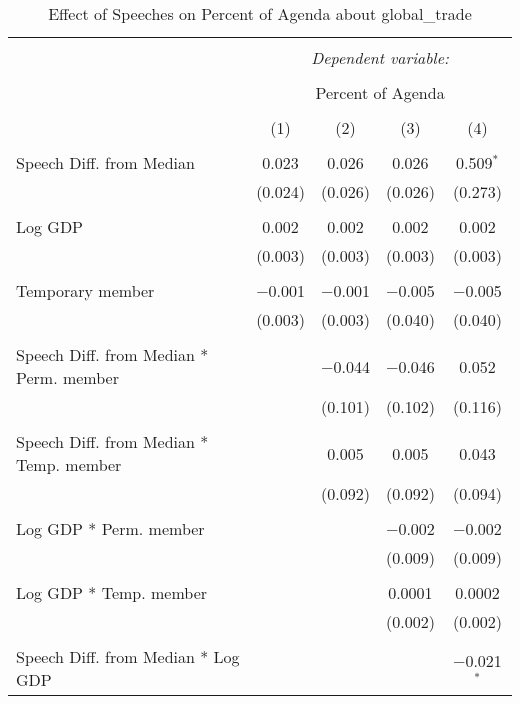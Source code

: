 
\begin{table}[!htbp] \centering 
  \caption{Effect of Speeches on Percent of Agenda about  global_trade} 
  \label{} 
\begin{tabular}{@{\extracolsep{5pt}}lcccc} 
\\[-1.8ex]\hline 
\hline \\[-1.8ex] 
 & \multicolumn{4}{c}{\textit{Dependent variable:}} \\ 
\cline{2-5} 
\\[-1.8ex] & \multicolumn{4}{c}{Percent of Agenda} \\ 
\\[-1.8ex] & (1) & (2) & (3) & (4)\\ 
\hline \\[-1.8ex] 
 Speech Diff. from Median & 0.023 & 0.026 & 0.026 & 0.509$^{*}$ \\ 
  & (0.024) & (0.026) & (0.026) & (0.273) \\ 
  & & & & \\ 
 Log GDP & 0.002 & 0.002 & 0.002 & 0.002 \\ 
  & (0.003) & (0.003) & (0.003) & (0.003) \\ 
  & & & & \\ 
 Temporary member & $-$0.001 & $-$0.001 & $-$0.005 & $-$0.005 \\ 
  & (0.003) & (0.003) & (0.040) & (0.040) \\ 
  & & & & \\ 
 Speech Diff. from Median * Perm. member &  & $-$0.044 & $-$0.046 & 0.052 \\ 
  &  & (0.101) & (0.102) & (0.116) \\ 
  & & & & \\ 
 Speech Diff. from Median * Temp. member &  & 0.005 & 0.005 & 0.043 \\ 
  &  & (0.092) & (0.092) & (0.094) \\ 
  & & & & \\ 
 Log GDP * Perm. member &  &  & $-$0.002 & $-$0.002 \\ 
  &  &  & (0.009) & (0.009) \\ 
  & & & & \\ 
 Log GDP * Temp. member &  &  & 0.0001 & 0.0002 \\ 
  &  &  & (0.002) & (0.002) \\ 
  & & & & \\ 
 Speech Diff. from Median * Log GDP &  &  &  & $-$0.021$^{*}$ \\ 

\end{tabular}
\end{table}
